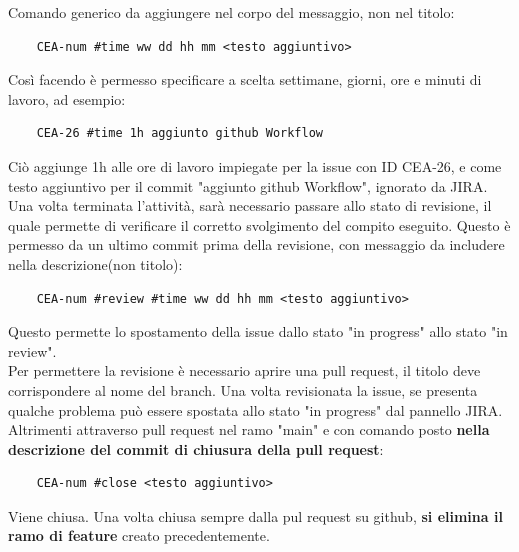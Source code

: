     Comando generico da aggiungere nel corpo del messaggio, non nel titolo:
    \begin{lstlisting}
    CEA-num #time ww dd hh mm <testo aggiuntivo>
    \end{lstlisting}
    Così facendo è permesso specificare a scelta settimane, giorni, ore e minuti di lavoro, ad esempio:
    \begin{lstlisting}
    CEA-26 #time 1h aggiunto github Workflow
    \end{lstlisting}
    Ciò aggiunge 1h alle ore di lavoro impiegate per la issue con ID CEA-26, e come testo aggiuntivo per il commit "aggiunto github Workflow", ignorato da JIRA.\\
    Una volta terminata l'attività, sarà necessario passare allo stato di revisione, il quale permette di verificare il corretto svolgimento del compito eseguito. Questo è permesso da un ultimo commit prima della revisione, con messaggio da includere nella descrizione(non titolo):
    \begin{lstlisting}
    CEA-num #review #time ww dd hh mm <testo aggiuntivo>
    \end{lstlisting}
    Questo permette lo spostamento della issue dallo stato "in progress" allo stato "in review".\\
    Per permettere la revisione è necessario aprire una pull request, il titolo deve corrispondere al nome del branch.
    Una volta revisionata la issue, se presenta qualche problema può essere spostata allo stato "in progress" dal pannello JIRA. Altrimenti attraverso pull request nel ramo "main" e con comando posto \textbf{nella descrizione del commit di chiusura della pull request}:
    \begin{lstlisting}
    CEA-num #close <testo aggiuntivo>
    \end{lstlisting}
    Viene chiusa. Una volta chiusa sempre dalla pul request su github, \textbf{si elimina il ramo di feature} creato precedentemente.
